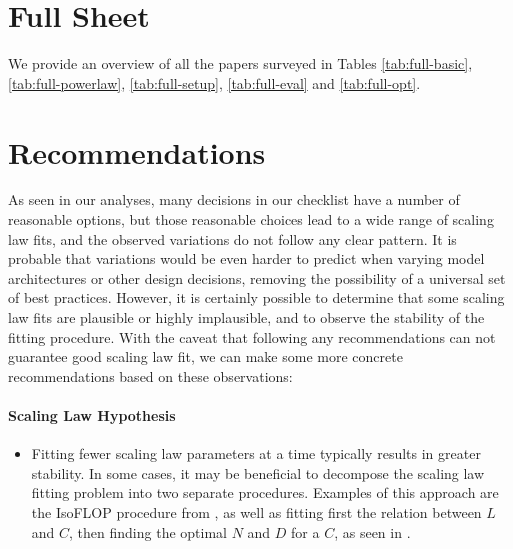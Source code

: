 

\pagebreak


\section{Full Sheet}\label{app:full-details}

We provide an overview of all the papers surveyed in Tables \ref{tab:full-basic},\ref{tab:full-powerlaw}, \ref{tab:full-setup}, \ref{tab:full-eval} and \ref{tab:full-opt}.






\newpage

\section{Recommendations}\label{sec:app_recs}

As seen in our analyses, many decisions in our checklist have a number of reasonable options, but those reasonable choices lead to a wide range of scaling law fits, and the observed variations do not follow any clear pattern. It is probable that variations would be even harder to predict when varying model architectures or other design decisions, removing the possibility of a universal set of best practices.
However, it is certainly possible to determine that some scaling law fits are plausible or highly implausible, and to observe the stability of the fitting procedure. 
With the caveat that following any recommendations can not guarantee good scaling law fit, we can make some more concrete recommendations based on these observations:
\paragraph{Scaling Law Hypothesis}
\begin{itemize}
    \item Fitting fewer scaling law parameters at a time typically results in greater stability. In some cases, it may be beneficial to decompose the scaling law fitting problem into two separate procedures. Examples of this approach are the IsoFLOP procedure from \citet{hoffmann2022training}, as well as fitting first the relation between $L$ and $C$, then finding the optimal $N$ and $D$ for a $C$, as seen in \citet{porian2024resolving}.
\end{itemize}
